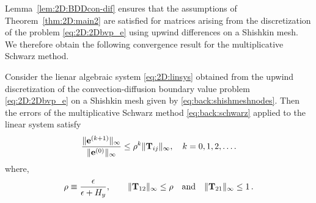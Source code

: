 Lemma~\ref{lem:2D:BDDcon-dif} ensures that the assumptions of Theorem~\ref{thm:2D:main2} are satisfied for matrices arising from the discretization of the problem \eqref{eq:2D:2Dbvp_e} using upwind differences
on a Shishkin mesh. We therefore obtain the following convergence
result for the multiplicative Schwarz method.
%
\begin{cor}\label{cor:2D:conv-diff}
Consider the lienar algebraic system \eqref{eq:2D:linsys} obtained from the upwind discretization of the convection-diffusion
boundary value problem \eqref{eq:2D:2Dbvp_e} on a Shishkin mesh given by
\eqref{eq:back:shishmeshnodes}. Then the errors of the  multiplicative Schwarz method \eqref{eq:back:schwarz} applied to the linear system satisfy
%
\begin{equation}\label{eq:2D:T_bound_CD}
  \frac{\|\mathbf{e}^{(k+1)}\|_{\infty}}{\|\mathbf{e}^{(0)}\|_{\infty}} \leq
  \rho^k
  \|\mathbf{T}_{ij}\|_{\infty},
  \quad k=0,1,2,\dots.
\end{equation}
%
where,
\begin{equation}\label{eq:2D:T_bound_CD2}
\rho\equiv \frac{\epsilon}{\epsilon+H_y},\qquad
  \| \mathbf{T}_{12} \|_{\infty} \leq
  \rho
  \quad\text{and}\quad \| \mathbf{T}_{21} \|_{\infty} \leq  1\,.
\end{equation}
%
\end{cor}

